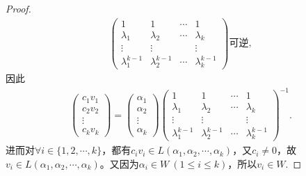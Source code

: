 \documentclass[../../main.tex]{subfiles}%
\begin{document}
\begin{proof}
\begin{align*}
\begin{pmatrix}
1 & 1 & \cdots & 1 \\
\lambda_1 & \lambda_2 & \cdots & \lambda_k \\
\vdots & \vdots & & \vdots \\
\lambda_1^{k - 1} & \lambda_2^{k - 1} & \cdots & \lambda_k^{k - 1}
\end{pmatrix} \text{可逆},
\end{align*}
因此
\begin{align*}
\begin{pmatrix}
c_1v_1 \\
c_2v_2 \\
\vdots \\
c_kv_k
\end{pmatrix} = 
\begin{pmatrix}
\alpha_1 \\
\alpha_2 \\
\vdots \\
\alpha_k
\end{pmatrix} 
\begin{pmatrix}
1 & 1 & \cdots & 1 \\
\lambda_1 & \lambda_2 & \cdots & \lambda_k \\
\vdots & \vdots & & \vdots \\
\lambda_1^{k - 1} & \lambda_2^{k - 1} & \cdots & \lambda_k^{k - 1}
\end{pmatrix}^{-1}.
\end{align*}
进而对$\forall i\in \{1,2,\cdots,k\}$，都有$c_iv_i\in L(\alpha_1,\alpha_2,\cdots,\alpha_k)$，又$c_i\ne 0$，故$v_i\in L(\alpha_1,\alpha_2,\cdots,\alpha_k)$。又因为$\alpha_i\in W\ (1\leqslant i\leqslant k)$，所以$v_i\in W$.
\end{proof}
\end{document}
